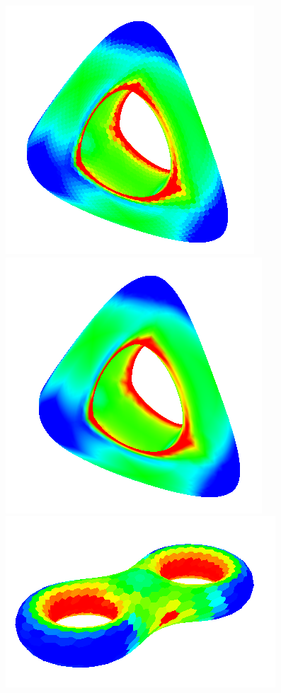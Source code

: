 \begin{figure}[!h]
    \centering
    \centering
    \includegraphics[scale=0.7]{images/gc-genus.png}
    \endminipage\hfill
    \centering
    \includegraphics[scale=0.7]{images/gci-genus.png}
    \endminipage\hfill
    \centering
    \includegraphics[scale=0.7]{images/gc-eight.png}

\end{figure}

